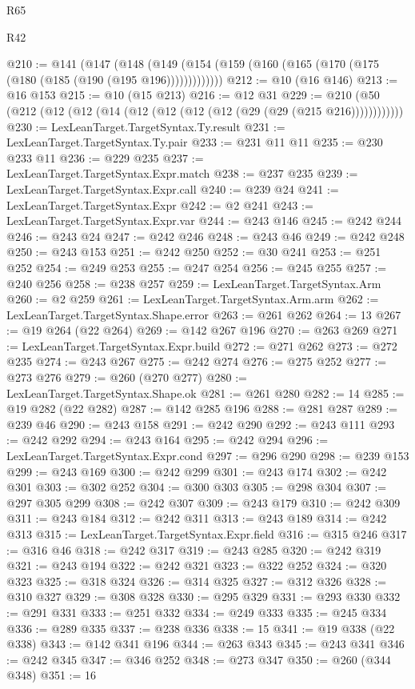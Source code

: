 \begin{lexlean}{R65}
\begin{lexlean}{R42}
\begin{coremodule}
{{{{{{{{{{{{{{{{{{{{{{{{{{{{{{{{{{{{{{{{{{{{{{{{{{{{{{{{{{{{{{{{{{{{{{{{{{{{{{{{{{{{{{{{{{{{{{{{{{{{{{{{{{{{{{{{{{{{{{{{{{{{{{{{{{{{{{{{{{{{{{{{{{{{{{{{{{{{{{{{{{{{{{{{{{{{{{{{{{{{{{{@210 := @141
    (@147 (@148 (@149 (@154 (@159 (@160 (@165 (@170 (@175 (@180 (@185 (@190 (@195 @196)))))))))))))
@212 := @10 (@16 @146)
@213 := @16 @153
@215 := @10 (@15 @213)
@216 := @12 @31
@229 := @210 (@50 (@212 (@12 (@12 (@14 (@12 (@12 (@12 (@12 (@29 (@29 (@215 @216))))))))))))
@230 := LexLeanTarget.TargetSyntax.Ty.result
@231 := LexLeanTarget.TargetSyntax.Ty.pair
@233 := @231 @11 @11
@235 := @230 @233 @11
@236 := @229 @235
@237 := LexLeanTarget.TargetSyntax.Expr.match
@238 := @237 @235
@239 := LexLeanTarget.TargetSyntax.Expr.call
@240 := @239 @24
@241 := LexLeanTarget.TargetSyntax.Expr
@242 := @2 @241
@243 := LexLeanTarget.TargetSyntax.Expr.var
@244 := @243 @146
@245 := @242 @244
@246 := @243 @24
@247 := @242 @246
@248 := @243 @46
@249 := @242 @248
@250 := @243 @153
@251 := @242 @250
@252 := @30 @241
@253 := @251 @252
@254 := @249 @253
@255 := @247 @254
@256 := @245 @255
@257 := @240 @256
@258 := @238 @257
@259 := LexLeanTarget.TargetSyntax.Arm
@260 := @2 @259
@261 := LexLeanTarget.TargetSyntax.Arm.arm
@262 := LexLeanTarget.TargetSyntax.Shape.error
@263 := @261 @262
@264 := 13
@267 := @19 @264 (@22 @264)
@269 := @142 @267 @196
@270 := @263 @269
@271 := LexLeanTarget.TargetSyntax.Expr.build
@272 := @271 @262
@273 := @272 @235
@274 := @243 @267
@275 := @242 @274
@276 := @275 @252
@277 := @273 @276
@279 := @260 (@270 @277)
@280 := LexLeanTarget.TargetSyntax.Shape.ok
@281 := @261 @280
@282 := 14
@285 := @19 @282 (@22 @282)
@287 := @142 @285 @196
@288 := @281 @287
@289 := @239 @46
@290 := @243 @158
@291 := @242 @290
@292 := @243 @111
@293 := @242 @292
@294 := @243 @164
@295 := @242 @294
@296 := LexLeanTarget.TargetSyntax.Expr.cond
@297 := @296 @290
@298 := @239 @153
@299 := @243 @169
@300 := @242 @299
@301 := @243 @174
@302 := @242 @301
@303 := @302 @252
@304 := @300 @303
@305 := @298 @304
@307 := @297 @305 @299
@308 := @242 @307
@309 := @243 @179
@310 := @242 @309
@311 := @243 @184
@312 := @242 @311
@313 := @243 @189
@314 := @242 @313
@315 := LexLeanTarget.TargetSyntax.Expr.field
@316 := @315 @246
@317 := @316 @46
@318 := @242 @317
@319 := @243 @285
@320 := @242 @319
@321 := @243 @194
@322 := @242 @321
@323 := @322 @252
@324 := @320 @323
@325 := @318 @324
@326 := @314 @325
@327 := @312 @326
@328 := @310 @327
@329 := @308 @328
@330 := @295 @329
@331 := @293 @330
@332 := @291 @331
@333 := @251 @332
@334 := @249 @333
@335 := @245 @334
@336 := @289 @335
@337 := @238 @336
@338 := 15
@341 := @19 @338 (@22 @338)
@343 := @142 @341 @196
@344 := @263 @343
@345 := @243 @341
@346 := @242 @345
@347 := @346 @252
@348 := @273 @347
@350 := @260 (@344 @348)
@351 := 16
}}}}}}}}}}}}}}}}}}}}}}}}}}}}}}}}}}}}}}}}}}}}}}}}}}}}}}}}}}}}}}}}}}}}}}}}}}}}}}}}}}}}}}}}}}}}}}}}}}}}}}}}}}}}}}}}}}}}}}}}}}}}}}}}}}}}}}}}}}}}}}}}}}}}}}}}}}}}}}}}}}}}}}}}}}}}}}}}}}}}}}}
\end{coremodule}
\end{lexlean}
\end{lexlean}
